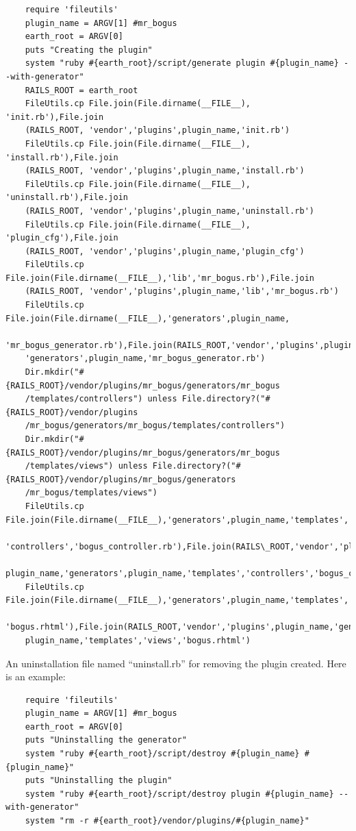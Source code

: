 \documentclass{article}
\begin{document}
\begin{verbatim}
    require 'fileutils' 
    plugin_name = ARGV[1] #mr_bogus 
    earth_root = ARGV[0]  
    puts "Creating the plugin" 
    system "ruby #{earth_root}/script/generate plugin #{plugin_name} --with-generator" 
    RAILS_ROOT = earth_root 
    FileUtils.cp File.join(File.dirname(__FILE__), 'init.rb'),File.join
    (RAILS_ROOT, 'vendor','plugins',plugin_name,'init.rb')  
    FileUtils.cp File.join(File.dirname(__FILE__), 'install.rb'),File.join
    (RAILS_ROOT, 'vendor','plugins',plugin_name,'install.rb')  
    FileUtils.cp File.join(File.dirname(__FILE__), 'uninstall.rb'),File.join
    (RAILS_ROOT, 'vendor','plugins',plugin_name,'uninstall.rb')  
    FileUtils.cp File.join(File.dirname(__FILE__), 'plugin_cfg'),File.join
    (RAILS_ROOT, 'vendor','plugins',plugin_name,'plugin_cfg') 
    FileUtils.cp File.join(File.dirname(__FILE__),'lib','mr_bogus.rb'),File.join
    (RAILS_ROOT, 'vendor','plugins',plugin_name,'lib','mr_bogus.rb')  
    FileUtils.cp File.join(File.dirname(__FILE__),'generators',plugin_name,
    'mr_bogus_generator.rb'),File.join(RAILS_ROOT,'vendor','plugins',plugin_name,
    'generators',plugin_name,'mr_bogus_generator.rb')  
    Dir.mkdir("#{RAILS_ROOT}/vendor/plugins/mr_bogus/generators/mr_bogus
    /templates/controllers") unless File.directory?("#{RAILS_ROOT}/vendor/plugins
    /mr_bogus/generators/mr_bogus/templates/controllers") 
    Dir.mkdir("#{RAILS_ROOT}/vendor/plugins/mr_bogus/generators/mr_bogus
    /templates/views") unless File.directory?("#{RAILS_ROOT}/vendor/plugins/mr_bogus/generators
    /mr_bogus/templates/views") 
    FileUtils.cp File.join(File.dirname(__FILE__),'generators',plugin_name,'templates',
    'controllers','bogus_controller.rb'),File.join(RAILS\_ROOT,'vendor','plugins',
    plugin_name,'generators',plugin_name,'templates','controllers','bogus_controller.rb') 
    FileUtils.cp File.join(File.dirname(__FILE__),'generators',plugin_name,'templates','views',
    'bogus.rhtml'),File.join(RAILS_ROOT,'vendor','plugins',plugin_name,'generators',
    plugin_name,'templates','views','bogus.rhtml') 
\end{verbatim}

An uninstallation file named ``uninstall.rb'' for removing the plugin created. Here is an example:\\

\begin{verbatim}
    require 'fileutils' 
    plugin_name = ARGV[1] #mr_bogus 
    earth_root = ARGV[0]  
    puts "Uninstalling the generator" 
    system "ruby #{earth_root}/script/destroy #{plugin_name} #{plugin_name}" 
    puts "Uninstalling the plugin" 
    system "ruby #{earth_root}/script/destroy plugin #{plugin_name} --with-generator" 
    system "rm -r #{earth_root}/vendor/plugins/#{plugin_name}"
\end{verbatim}
\end{document}
